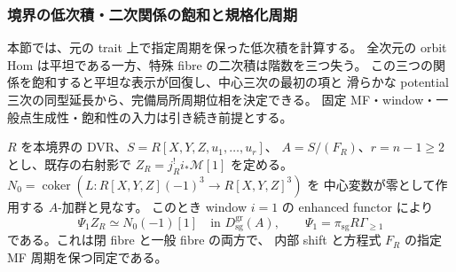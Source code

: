 \subsubsection{境界の低次積・二次関係の飽和と規格化周期}
\label{subsubsec:nfm-boundary-products-period}

本節では、元の trait 上で指定周期を保った低次積を計算する。
全次元の orbit Hom は平坦である一方、特殊 fibre の二次積は階数を三つ失う。
この三つの関係を飽和すると平坦な表示が回復し、中心三次の最初の項と
滑らかな potential 三次の同型延長から、完備局所周期位相を決定できる。
固定 MF・window・一般点生成性・飽和性の入力は引き続き前提とする。

\begin{lemma}
\label{lem:nfm-boundary-right-window-module-alln}
$R$ を本境界の DVR、$S=R[X,Y,Z,u_1,\ldots,u_r]$、
$A=S/(F_R)$、$r=n-1\ge2$ とし、既存の右射影で
$Z_R=j_R^!i_*\mathcal M[1]$ を定める。
$N_0=\operatorname{coker}(L:R[X,Y,Z](-1)^3\to R[X,Y,Z]^3)$ を
中心変数が零として作用する $A$-加群と見なす。
このとき window $i=1$ の enhanced functor により
\[
 \Psi_1Z_R\simeq N_0(-1)[1]\quad\text{in }D_{\mathrm{sg}}^{\mathrm{gr}}(A),
 \qquad\Psi_1=\pi_{\mathrm{sg}}R\Gamma_{\ge1}
\]
である。これは閉 fibre と一般 fibre の両方で、
内部 shift と方程式 $F_R$ の指定 MF 周期を保つ同定である。
\end{lemma}

